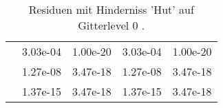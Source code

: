 \begin{table}
\begin{tabular}{c|cc|cc|}
\multicolumn{1}{|c|}{} & \multicolumn{1}{|c|}{  3.03e-04} & \multicolumn{1}{|c|}{  1.00e-20} & \multicolumn{1}{|c|}{  3.03e-04} & \multicolumn{1}{|c|}{  1.00e-20} \\ 
\multicolumn{1}{|c|}{} & \multicolumn{1}{|c|}{  1.27e-08} & \multicolumn{1}{|c|}{  3.47e-18} & \multicolumn{1}{|c|}{  1.27e-08} & \multicolumn{1}{|c|}{  3.47e-18} \\ 
\multicolumn{1}{|c|}{} & \multicolumn{1}{|c|}{  1.37e-15} & \multicolumn{1}{|c|}{  3.47e-18} & \multicolumn{1}{|c|}{  1.37e-15} & \multicolumn{1}{|c|}{  3.47e-18} \\ 
\hline 
\end{tabular}\caption{Residuen mit Hinderniss 'Hut' auf Gitterlevel 0 .}\label{tab:Residuum_Hut_level0}
\end{table} 
